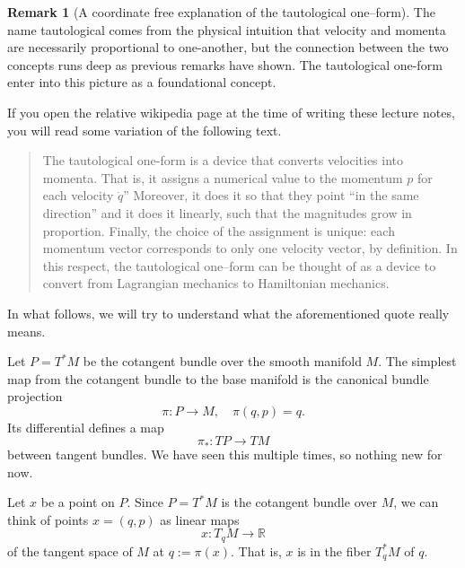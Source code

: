 \documentclass[english,fontsize=11pt,paper=b5]{scrbook}
\theoremstyle{definition}
\newtheorem{remark}{Remark}[chapter]
\begin{document}
    \begin{remark}[A coordinate free explanation of the tautological one--form]
      The name tautological comes from the physical intuition that velocity and momenta are necessarily proportional to one-another, but the connection between the two concepts runs deep as previous remarks have shown.
      The tautological one-form enter into this picture as a foundational concept.

      If you open the relative wikipedia page at the time of writing these lecture notes, you will read some variation of the following text.
      \begin{quote}
        The tautological one-form is a device that converts velocities into momenta.
        That is, it assigns a numerical value to the momentum $p$ for each velocity $\dot {q}$''
        Moreover, it does it so that they point ``in the same direction'' and it does it linearly, such that the magnitudes grow in proportion.
        Finally, the choice of the assignment is unique: each momentum vector corresponds to only one velocity vector, by definition.
        In this respect, the tautological one--form can be thought of as a device to convert from Lagrangian mechanics to Hamiltonian mechanics.
      \end{quote}
      In what follows, we will try to understand what the aforementioned quote really means.

      Let $P = T^* M$ be the cotangent bundle over the smooth manifold $M$.
      The simplest map from the cotangent bundle to the base manifold is the canonical bundle projection
      \begin{equation}
        \pi :P\to M,\quad \pi(q,p) = q.
      \end{equation}
      Its differential defines a map
      \begin{equation}
        \pi_* : TP \to TM
      \end{equation}
      between tangent bundles.
      We have seen this multiple times, so nothing new for now.

      Let $x$ be a point on $P$.
      Since $P = T^*M$ is the cotangent bundle over $M$, we can think of points $x = (q,p)$ as linear maps
      \begin{equation}
        x : T_q M \to \mathbb{R}
      \end{equation}
      of the tangent space of $M$ at $q := \pi(x)$.
      That is, $x$ is in the fiber $T^*_qM$ of $q$.


\end{remark}
\end{document}
